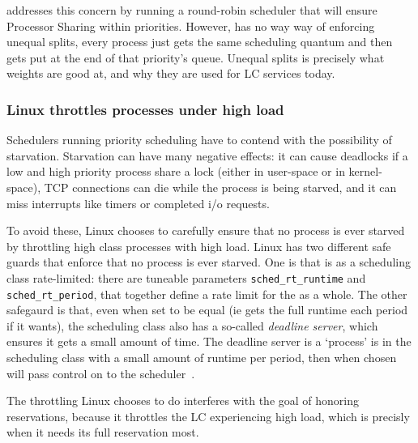 \schedrr{} addresses this concern by running a round-robin scheduler that will
ensure Processor Sharing within priorities. However, \schedrr{} has no way way
of enforcing unequal splits, every process just gets the same scheduling quantum
and then gets put at the end of that priority's queue. Unequal splits is
precisely what weights are good at, and why they are used for LC services today.

\subsubsection{Linux throttles \rtclass{} processes under high load
}\label{sss:approach:linux:starve-throttle}

Schedulers running priority scheduling have to contend with the possibility of
starvation. Starvation can have many negative effects: it can cause deadlocks if
a low and high priority process share a lock (either in user-space or in
kernel-space), TCP connections can die while the process is being starved, and
it can miss interrupts like timers or completed i/o requests.

To avoid these, Linux chooses to carefully ensure that no process is ever
starved by throttling high class processes with high load. Linux has two
different safe guards that enforce that no process is ever starved. One is that
\rtclass{} is as a scheduling class rate-limited: there are tuneable parameters
\texttt{sched\_rt\_runtime} and \texttt{sched\_rt\_period}, that together define
a rate limit for the \rtclass{} as a whole. The other safegaurd is that, even
when set to be equal (ie \rtclass{} gets the full runtime each period if it
wants), the \normalclass{} scheduling class also has a so-called
\textit{deadline server}, which ensures it gets a small amount of time. The
deadline server is a `process' is in the \deadlineclass{} scheduling class with
a small amount of runtime per period, then when chosen will pass control on to
the \normalclass{} scheduler~\cite{lkml-deadline-srv}.

The throttling Linux chooses to do interferes with the goal of honoring
reservations, because it throttles the LC experiencing high load, which is
precisly when it needs its full reservation  most.


